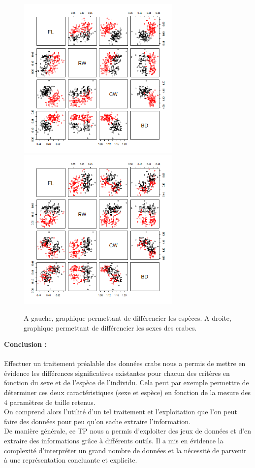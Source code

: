 \documentclass[a4paper, 8pt]{article}
\begin{document}
\begin{figure}[h!]
\includegraphics[height = 8cm, width = 8cm]{plots/plot_crabs_sp_2.png}
\includegraphics[height = 8cm, width = 8cm]{plots/plot_crabs_sex_2.png}
\caption{A gauche, graphique permettant de différencier les espèces. A droite, graphique permettant de différencier les sexes des crabes.}
\end{figure} 


\textbf{Conclusion :}\\ \\
Effectuer un traitement préalable des données crabs nous a permis de mettre en évidence les différences significatives existantes pour chacun des critères en fonction du sexe et de l’espèce de l’individu. Cela peut par exemple permettre de déterminer ces deux caractéristiques (sexe et espèce) en fonction de la mesure des 4 paramètres de taille retenus. \\On comprend alors l’utilité d’un tel traitement et l’exploitation que l’on peut faire des données pour peu qu’on sache extraire l’information. 
\\ De manière générale, ce TP nous a permis d’exploiter des jeux de données et d’en extraire des informations grâce à différents outils. Il a mis en évidence la complexité d’interpréter un grand nombre de données et la nécessité de parvenir à une représentation concluante et explicite.
\end{document}
